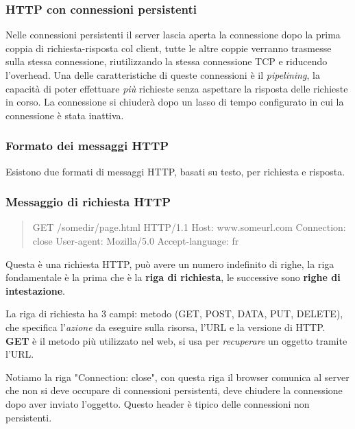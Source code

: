 \subsubsection*{HTTP con connessioni persistenti}
Nelle connessioni persistenti il server lascia aperta la connessione dopo la prima coppia di richiesta-risposta col client, tutte le altre coppie verranno trasmesse sulla stessa connessione, riutilizzando la stessa connessione TCP e riducendo l'overhead.
Una delle caratteristiche di queste connessioni è il \textit{pipelining}, la capacità di poter effettuare \textit{più} richieste senza aspettare la risposta delle richieste in corso.
La connessione si chiuderà dopo un lasso di tempo configurato in cui la connessione è stata inattiva.

\subsubsection{Formato dei messaggi HTTP}
Esistono due formati di messaggi HTTP, basati su testo, per richiesta e risposta.

\subsubsection*{Messaggio di richiesta HTTP}
\begin{quote}
  GET /somedir/page.html HTTP/1.1 \newline
  Host: www.someurl.com \newline
  Connection: close \newline
  User-agent: Mozilla/5.0 \newline
  Accept-language: fr
\end{quote}

Questa è una richiesta HTTP, può avere un numero indefinito di righe, la riga fondamentale è la prima che è la \textbf{riga di richiesta}, le successive sono \textbf{righe di intestazione}.

La riga di richiesta ha 3 campi: metodo (GET, POST, DATA, PUT, DELETE), che specifica l'\textit{azione} da eseguire sulla risorsa, l'URL e la versione di HTTP.
\textbf{GET} è il metodo più utilizzato nel web, si usa per \textit{recuperare} un oggetto tramite l'URL.

Notiamo la riga "Connection: close", con questa riga il browser comunica al server che non si deve occupare di connessioni persistenti, deve chiudere la connessione dopo aver inviato l'oggetto. Questo header è tipico delle connessioni non persistenti.

